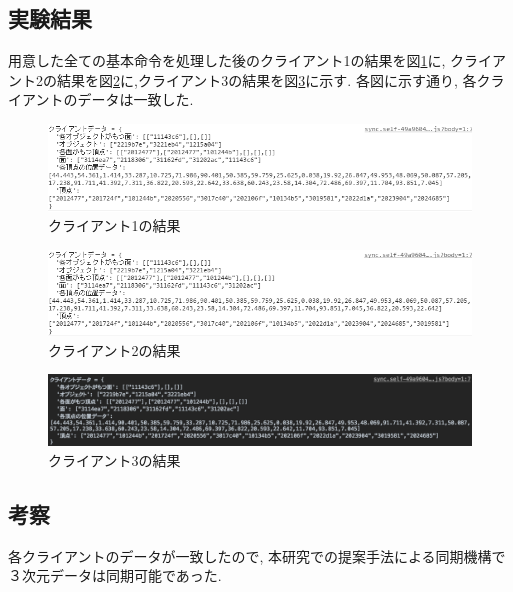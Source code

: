 \subsection{実験結果}
用意した全ての基本命令を処理した後のクライアント1の結果を図\ref{kekka1}に, クライアント2の結果を図\ref{kekka2}に,クライアント3の結果を図\ref{kekka3}に示す.
各図に示す通り, 各クライアントのデータは一致した.
\begin{figure}[]
 \begin{center}
	 \includegraphics[scale=0.6]{images/kekka1}
	 \caption{クライアント1の結果}
	 \label{kekka1}
 \end{center}
\end{figure}
\begin{figure}[]
 \begin{center}
	 \includegraphics[scale=0.6]{images/kekka2}
	 \caption{クライアント2の結果}
	 \label{kekka2}
 \end{center}
\end{figure}
\begin{figure}[]
 \begin{center}
	 \includegraphics[scale=0.3]{images/kekka3}
	 \caption{クライアント3の結果}
	 \label{kekka3}
 \end{center}
\end{figure}
\subsection{考察}
各クライアントのデータが一致したので,
本研究での提案手法による同期機構で３次元データは同期可能であった.
